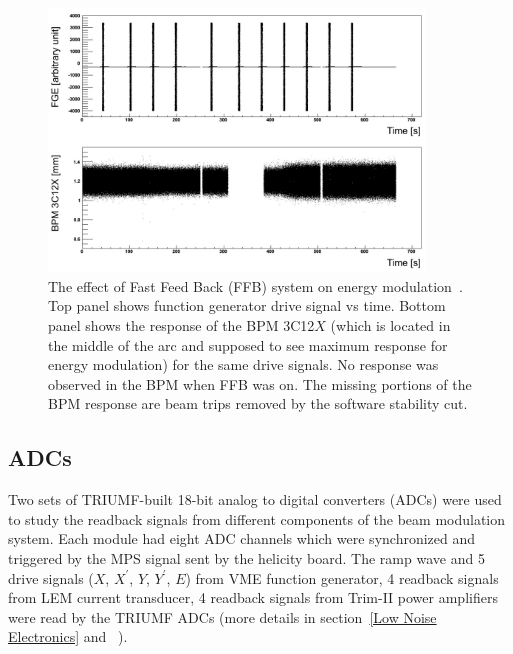 \begin{singlespace}
\begin{figure}[!h]
	\begin{center}
	\includegraphics[width=10.0cm]{figures/FFBEnergy}
	\end{center}
	\caption
	{The effect of Fast Feed Back (FFB) system on energy modulation~\cite{hclog:armd_249809}. Top panel shows function generator drive signal vs time. Bottom panel shows the response of the BPM 3C12$X$ (which is located in the middle of the arc and supposed to see maximum response for energy modulation) for the same drive signals. No response was observed in the BPM when FFB was on. The missing portions of the BPM response are beam trips removed by the software stability cut.}
	\label{fig:FFBEnergy}
\end{figure}
\end{singlespace}

\subsection{ADCs}
\label{ADCs}
Two sets of TRIUMF-built 18-bit analog to digital converters (ADCs) were used to study the readback signals from different components of the beam modulation system. 
Each module had eight ADC channels which were synchronized and triggered by the MPS signal sent by the helicity board.
The ramp wave and 5 drive signals ($X$, $X^{\prime}$, $Y$, $Y^{\prime}$, $E$) from VME function generator, 4 readback signals from LEM current transducer, 4 readback signals from Trim-II power amplifiers were read by the TRIUMF ADCs (more details in section~\ref{Low Noise Electronics} and~\cite{website:TRIUMF, manual_TRIUMF_ADC} ). 

